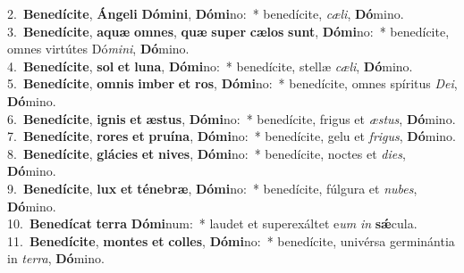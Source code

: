 {2.~}\textbf{Be}\textbf{ne}\textbf{dí}\textbf{ci}\textbf{te}, \textbf{Án}\textbf{ge}\textbf{li} \textbf{Dó}\textbf{mi}\textbf{ni}, \textbf{Dó}\textbf{mi}no:~* benedícite, \textit{cæ}\textit{li}, \textbf{Dó}mino.\\
{3.~}\textbf{Be}\textbf{ne}\textbf{dí}\textbf{ci}\textbf{te}, \textbf{a}\textbf{quæ} \textbf{om}\textbf{nes}, \textbf{quæ} \textbf{su}\textbf{per} \textbf{cæ}\textbf{los} \textbf{sunt}, \textbf{Dó}\textbf{mi}no:~* benedícite, omnes virtútes Dó\textit{mi}\textit{ni}, \textbf{Dó}mino.\\
{4.~}\textbf{Be}\textbf{ne}\textbf{dí}\textbf{ci}\textbf{te}, \textbf{sol} \textbf{et} \textbf{lu}\textbf{na}, \textbf{Dó}\textbf{mi}no:~* benedícite, stellæ \textit{cæ}\textit{li}, \textbf{Dó}mino.\\
{5.~}\textbf{Be}\textbf{ne}\textbf{dí}\textbf{ci}\textbf{te}, \textbf{om}\textbf{nis} \textbf{im}\textbf{ber} \textbf{et} \textbf{ros}, \textbf{Dó}\textbf{mi}no:~* benedícite, omnes spíritus \textit{De}\textit{i}, \textbf{Dó}mino.\\
{6.~}\textbf{Be}\textbf{ne}\textbf{dí}\textbf{ci}\textbf{te}, \textbf{i}\textbf{gnis} \textbf{et} \textbf{æ}\textbf{stus}, \textbf{Dó}\textbf{mi}no:~* benedícite, frigus et \textit{æ}\textit{stus}, \textbf{Dó}mino.\\
{7.~}\textbf{Be}\textbf{ne}\textbf{dí}\textbf{ci}\textbf{te}, \textbf{ro}\textbf{res} \textbf{et} \textbf{pru}\textbf{í}\textbf{na}, \textbf{Dó}\textbf{mi}no:~* benedícite, gelu et \textit{fri}\textit{gus}, \textbf{Dó}mino.\\
{8.~}\textbf{Be}\textbf{ne}\textbf{dí}\textbf{ci}\textbf{te}, \textbf{glá}\textbf{ci}\textbf{es} \textbf{et} \textbf{ni}\textbf{ves}, \textbf{Dó}\textbf{mi}no:~* benedícite, noctes et \textit{di}\textit{es}, \textbf{Dó}mino.\\
{9.~}\textbf{Be}\textbf{ne}\textbf{dí}\textbf{ci}\textbf{te}, \textbf{lux} \textbf{et} \textbf{té}\textbf{ne}\textbf{bræ}, \textbf{Dó}\textbf{mi}no:~* benedícite, fúlgura et \textit{nu}\textit{bes}, \textbf{Dó}mino.\\
{10.~}\textbf{Be}\textbf{ne}\textbf{dí}\textbf{cat} \textbf{ter}\textbf{ra} \textbf{Dó}\textbf{mi}num:~* laudet et superexáltet e\textit{um} \textit{in} \textbf{sǽ}cula.\\
{11.~}\textbf{Be}\textbf{ne}\textbf{dí}\textbf{ci}\textbf{te}, \textbf{mon}\textbf{tes} \textbf{et} \textbf{col}\textbf{les}, \textbf{Dó}\textbf{mi}no:~* benedícite, univérsa germinántia in \textit{ter}\textit{ra}, \textbf{Dó}mino.\\
